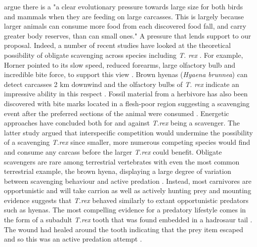 \indent
\cite{ruxton2004obligate} argue there is a "a clear evolutionary pressure towards large size for both birds and mammals when they are feeding on large carcasses. This is largely because larger animals can consume more food from each discovered food fall, and carry greater body reserves, than can small ones."
A pressure that lends support to our proposal. Indeed, a number of recent studies have looked at the theoretical possibility of obligate scavenging across species including \textit{T. rex} \citep{ruxton2004energetic,ruxton2013endurance,ruxton2005searching,ruxton2004obligate,ruxton2003could,carbone2011intra}. For example, Horner pointed to its slow speed, reduced forearms, large olfactory bulb and incredible bite force, to support this view \citep{horner1994steak,horner1993complete}. Brown hyenas (\textit{Hyaena brunnea}) can detect carcasses 2 km downwind \citep{mills1984comparative} and the olfactory bulbs of \textit{T. rex} indicate an impressive ability in this respect \citep{witmer2009new}. Fossil material from a herbivore has also been discovered with bite marks located in a flesh-poor region suggesting a scavenging event after the preferred sections of the animal were consumed \citep{longrich2010cannibalism}. Energetic approaches have concluded both for \citep{ruxton2003could} and against \citep{carbone2011intra} \textit{T.rex} being a scavenger. The latter study argued that interspecific competition would undermine the possibility of a scavenging \textit{T.rex} since smaller, more numerous competing species would find and consume any carcass before the larger \textit{T.rex} could benefit. Obligate scavengers are rare among terrestrial vertebrates with even the most common terrestrial example, the brown hyena, displaying a large degree of variation between scavenging behaviour and active predation \citep{devault2003scavenging,sinclair1995serengeti}.  Instead, most carnivores are opportunistic and will take carrion as well as actively hunting prey \citep{devault2003scavenging} and mounting evidence suggests that \textit{T.rex} behaved similarly to extant opportunistic predators such as hyenas. The most compelling evidence for a predatory lifestyle comes in the form of a subadult \textit{T.rex} tooth that was found embedded in a hadrosaur tail \citep{depalma2013physical}. The wound had healed around the tooth indicating that the prey item escaped and so this was an active predation attempt \citep{depalma2013physical}. \\
\indent
